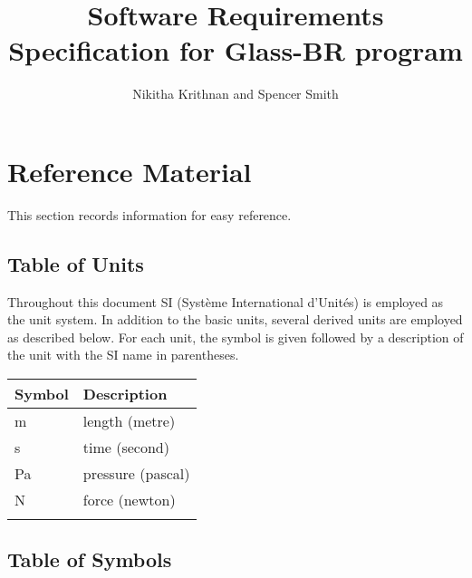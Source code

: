 \documentclass[12pt]{article}
\title{Software Requirements Specification for Glass-BR program}
\author{Nikitha Krithnan and Spencer Smith}
\begin{document}
\maketitle
\tableofcontents
\newpage
\section{Reference Material}
\label{Sec:RM}
This section records information for easy reference.
\subsection{Table of Units}
\label{Sec:ToU}
Throughout this document SI (Syst\`{e}me International d'Unit\'{e}s) is employed as the unit system. In addition to the basic units, several derived units are employed as described below. For each unit, the symbol is given followed by a description of the unit with the SI name in parentheses.
\begin{longtable*}{l l}
\toprule
Symbol & Description
\\
\midrule
m & length (metre)
\\
s & time (second)
\\
Pa & pressure (pascal)
\\
N & force (newton)
\\
\bottomrule
\label{Table:ToU}
\end{longtable*}
\subsection{Table of Symbols}
\label{Sec:ToS}
\end{document}
